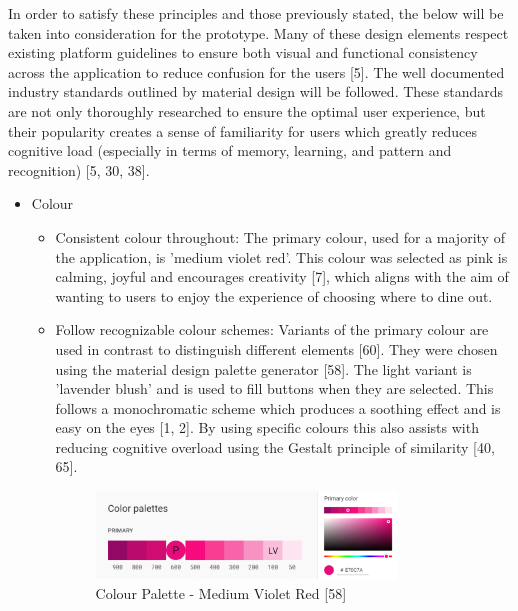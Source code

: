 \documentclass[a4 paper, 12pt]{article}
\begin{document}
    In order to satisfy these principles and those previously stated, the below will be taken into consideration for the prototype. Many of these design elements respect existing platform guidelines to ensure both visual and functional consistency across the application to reduce confusion for the users [5]. The well documented industry standards outlined by material design will be followed. These standards are not only thoroughly researched to ensure the optimal user experience, but their popularity creates a sense of familiarity for users which greatly reduces cognitive load (especially in terms of memory, learning, and pattern and recognition) [5, 30, 38]. 
        \begin{itemize}
            \item Colour
                \begin{itemize}
                    \item Consistent colour throughout: The primary colour, used for a majority of the application, is 'medium violet red'. This colour was selected as pink is calming, joyful and encourages creativity [7], which aligns with the aim of wanting to users to enjoy the experience of choosing where to dine out.
                    \item Follow recognizable colour schemes: Variants of the primary colour are used in contrast to distinguish different elements [60]. They were chosen using the material design palette generator [58]. The light variant is 'lavender blush' and is used to fill buttons when they are selected. This follows a monochromatic scheme which produces a soothing effect and is easy on the eyes [1, 2]. By using specific colours this also assists with reducing cognitive overload using the Gestalt principle of similarity [40, 65].   
                    \begin{figure} [H]
                        \centering
                        \includegraphics[width=0.8\textwidth, frame]
                            {./Med_Fidelity/Med_Report/images/colour_med.PNG}
                        \caption{Colour Palette - Medium Violet Red [58]}
                    \end{figure}
                \end{itemize}


\end{itemize}
\end{document}
